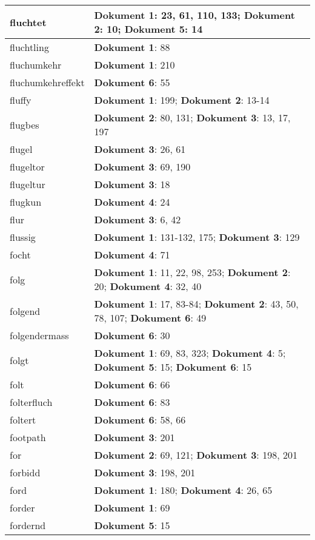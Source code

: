 \documentclass[a5paper]{article}
\begin{document}
\begin{longtable}[l]{|l|p{3in}|}
\hline
fluchtet & \textbf{Dokument 1}: 23, 61, 110, 133; \textbf{Dokument 2}: 10; \textbf{Dokument 5}: 14 \\
\hline
fluchtling & \textbf{Dokument 1}: 88 \\
\hline
fluchumkehr & \textbf{Dokument 1}: 210 \\
\hline
fluchumkehreffekt & \textbf{Dokument 6}: 55 \\
\hline
fluffy & \textbf{Dokument 1}: 199; \textbf{Dokument 2}: 13-14 \\
\hline
flugbes & \textbf{Dokument 2}: 80, 131; \textbf{Dokument 3}: 13, 17, 197 \\
\hline
flugel & \textbf{Dokument 3}: 26, 61 \\
\hline
flugeltor & \textbf{Dokument 3}: 69, 190 \\
\hline
flugeltur & \textbf{Dokument 3}: 18 \\
\hline
flugkun & \textbf{Dokument 4}: 24 \\
\hline
flur & \textbf{Dokument 3}: 6, 42 \\
\hline
flussig & \textbf{Dokument 1}: 131-132, 175; \textbf{Dokument 3}: 129 \\
\hline
focht & \textbf{Dokument 4}: 71 \\
\hline
folg & \textbf{Dokument 1}: 11, 22, 98, 253; \textbf{Dokument 2}: 20; \textbf{Dokument 4}: 32, 40 \\
\hline
folgend & \textbf{Dokument 1}: 17, 83-84; \textbf{Dokument 2}: 43, 50, 78, 107; \textbf{Dokument 6}: 49 \\
\hline
folgendermass & \textbf{Dokument 6}: 30 \\
\hline
folgt & \textbf{Dokument 1}: 69, 83, 323; \textbf{Dokument 4}: 5; \textbf{Dokument 5}: 15; \textbf{Dokument 6}: 15 \\
\hline
folt & \textbf{Dokument 6}: 66 \\
\hline
folterfluch & \textbf{Dokument 6}: 83 \\
\hline
foltert & \textbf{Dokument 6}: 58, 66 \\
\hline
footpath & \textbf{Dokument 3}: 201 \\
\hline
for & \textbf{Dokument 2}: 69, 121; \textbf{Dokument 3}: 198, 201 \\
\hline
forbidd & \textbf{Dokument 3}: 198, 201 \\
\hline
ford & \textbf{Dokument 1}: 180; \textbf{Dokument 4}: 26, 65 \\
\hline
forder & \textbf{Dokument 1}: 69 \\
\hline
fordernd & \textbf{Dokument 5}: 15 \\

\end{longtable}
\end{document}
